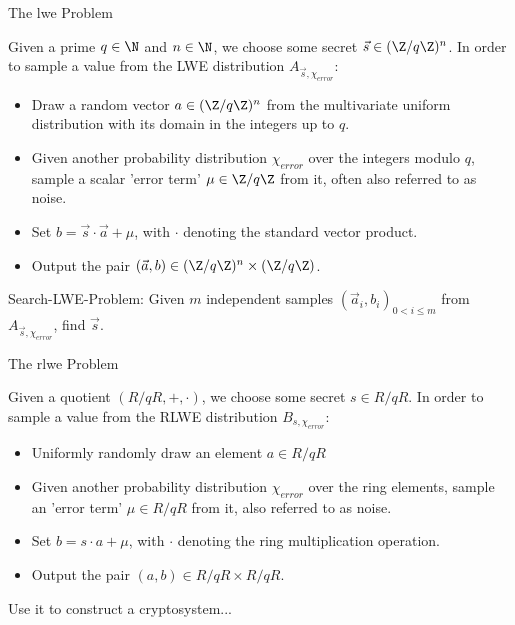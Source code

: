 \documentclass[aspectratio=169]{beamer}
\begin{document}
  \begin{frame}{The \gls{lwe} Problem}
    \begin{definition}
      Given a prime $q \in \N$ and $n \in \N$, we choose some secret $\vec{s} \in (\Z / q \Z)^n$.
      In order to sample a value from the LWE distribution $A_{\vec{s}, \chi_{error}}$:
      \begin{itemize}
        \item Draw a random vector $a \in (\Z/q\Z)^n$ from the multivariate uniform distribution with its domain in the integers up to $q$.
        \item Given another probability distribution $\chi_{error}$ over the integers modulo $q$, sample a scalar 'error term' $\mu \in \Z / q \Z$ from it, often also referred to as noise.
        \item Set $b = \vec{s} \cdot \vec{a} + \mu$, with $\cdot$ denoting the standard vector product.
        \item Output the pair $(\vec{a}, b) \in (\Z / q \Z)^n \times (\Z / q \Z)$.
      \end{itemize}
    \end{definition}

    Search-LWE-Problem:
    Given $m$ independent samples $(\vec{a}_i, b_i)_{0 < i \leq m}$ from $A_{\vec{s}, \chi_{error}}$, find $\vec{s}$.
  \end{frame}

  \begin{frame}{The \gls{rlwe} Problem}
    \begin{corollary}
      Given a quotient $(R/qR, +, \cdot)$, we choose some secret $s \in R/qR$.
      In order to sample a value from the RLWE distribution $B_{s, \chi_{error}}$:
      \begin{itemize}
        \item Uniformly randomly draw an element $a \in R/qR$
        \item Given another probability distribution $\chi_{error}$ over the ring elements, sample an 'error term' $\mu \in R/qR$ from it, also referred to as noise.
        \item Set $b = s \cdot a + \mu$, with $\cdot$ denoting the ring multiplication operation.
        \item Output the pair $(a, b) \in R/qR \times R/qR$.
      \end{itemize}
    \end{corollary}

    Use it to construct a cryptosystem...
  \end{frame}
\end{document}
